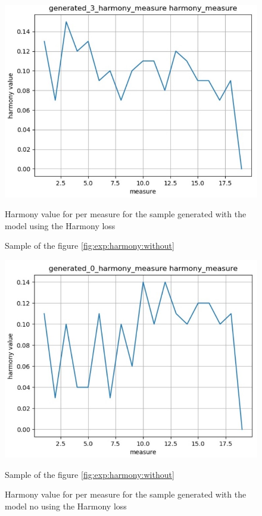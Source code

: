 \documentclass[12pt]{report}
\begin{document}
\begin{figure}[htbp]
    \begin{minipage}{0.5\textwidth}
        \begin{center}
            \includegraphics[width=\textwidth]{images/experiences/harmony-rnn/generated-harmony-with-harmony.jpg}
            \caption{Harmony value for per measure for the sample generated with the model using the Harmony loss}
            Sample of the figure \ref{fig:exp:harmony:without}
            \label{fig:exp:harmony:generated-harmony:with}
        \end{center}
    \end{minipage} \hfill
    \begin{minipage}{0.5 \textwidth}
        \begin{center}
            \includegraphics[width=\textwidth]{images/experiences/harmony-rnn/generated-harmony-without-harmony.jpg}
            \caption{Harmony value for per measure for the sample generated with the model no using the Harmony loss}
            Sample of the figure \ref{fig:exp:harmony:without}
            \label{fig:exp:harmony:generated-harmony:without}
        \end{center}
    \end{minipage}
\end{figure}
\end{document}

